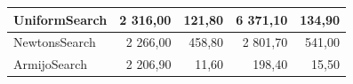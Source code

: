 \documentclass[a4paper,english,titlepage,12pt]{article}
\begin{document}
\begin{table}[H]
\begin{tabular}{|l|r|r|r|r|}
    UniformSearch                                                             & \cellcolor[HTML]{FDF0EF}2 316,00                         & \cellcolor[HTML]{FDF0EF}121,80                            & \cellcolor[HTML]{E67B73}6 371,10                          & \cellcolor[HTML]{FDF0EF}134,90                            \\ \hline
    NewtonsSearch                                                             & 2 266,00                                                 & \cellcolor[HTML]{E67B73}458,80                            & \cellcolor[HTML]{F6CFCB}2 801,70                          & \cellcolor[HTML]{E67B73}541,00                            \\ \hline
    ArmijoSearch                                                              & \cellcolor[HTML]{E5F4ED}2 206,90                         & \cellcolor[HTML]{57BB89}11,60                             & \cellcolor[HTML]{57BB89}198,40                            & \cellcolor[HTML]{57BB89}15,50                             \\ \hline
    \end{tabular}
\end{table}
\end{document}
